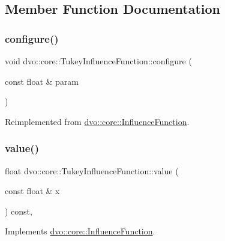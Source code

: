 \subsection{Member Function Documentation}
\mbox{\label{classdvo_1_1core_1_1_tukey_influence_function_afa49d538d3eee4c545bb690a0aca0f11}} 
\subsubsection{\texorpdfstring{configure()}{configure()}}
{\footnotesize\ttfamily void dvo\+::core\+::\+Tukey\+Influence\+Function\+::configure (\begin{DoxyParamCaption}\item[{const float \&}]{param }\end{DoxyParamCaption})\hspace{0.3cm}{\ttfamily [virtual]}}



Reimplemented from \mbox{\hyperlink{classdvo_1_1core_1_1_influence_function_a4773b03ca609bc5d8391d09d92ab34ad}{dvo\+::core\+::\+Influence\+Function}}.

\mbox{\label{classdvo_1_1core_1_1_tukey_influence_function_a3a1829e6316ecffdceea8c54169c5ef1}} 
\subsubsection{\texorpdfstring{value()}{value()}}
{\footnotesize\ttfamily float dvo\+::core\+::\+Tukey\+Influence\+Function\+::value (\begin{DoxyParamCaption}\item[{const float \&}]{x }\end{DoxyParamCaption}) const\hspace{0.3cm}{\ttfamily [inline]}, {\ttfamily [virtual]}}



Implements \mbox{\hyperlink{classdvo_1_1core_1_1_influence_function_a158082c763fa9de460e75a285bb91f1e}{dvo\+::core\+::\+Influence\+Function}}.



